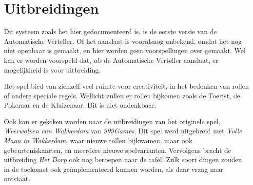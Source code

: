 \documentclass[12pt]{article}
\begin{document}
\section{Uitbreidingen}

  Dit systeem zoals het hier gedocumenteerd is, is de eerste versie van de Automatische Verteller. Of het aanslaat is vooralsnog onbekend, omdat het nog niet openbaar is gemaakt, en hier worden geen voorspellingen over gemaakt. Wel kan er worden voorspeld dat, \emph{als} de Automatische Verteller aanslaat, er mogelijkheid is voor uitbreiding. 
  
  Het spel bied van zichzelf veel ruimte voor creativiteit, in het bedenken van rollen of andere speciale regels. Wellicht zullen er rollen bijkomen zoals de Toerist, de Pokeraar en de Kluizenaar. Dit is niet ondenkbaar.
  
  Ook kan er gekeken worden naar de uitbreidingen van het originele spel, \emph{Weerwolven van Wakkerdam} van \emph{999Games}. Dit spel werd uitgebreid met \emph{Volle Maan in Wakkerdam}, waar nieuwe rollen bijkwamen, maar ook gebeurteniskaarten, en meerdere nieuwe spelvarianten. Vervolgens bracht de uitbreiding \emph{Het Dorp} ook nog beroepen naar de tafel. Zulk soort dingen zouden in de toekomst ook ge\"implementeerd kunnen worden, als daar vraag naar ontstaat.
\end{document}
